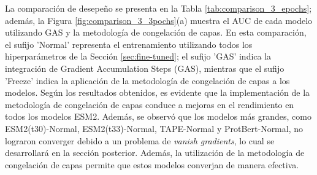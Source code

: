 La comparación de desepeño se presenta en la Tabla \ref{tab:comparison_3_epochs}; además, la Figura \ref{fig:comparison_3_3pochs}(a) muestra el AUC de cada modelo utilizando GAS y la metodología de congelación de capas. En esta comparación, el sufijo 'Normal' representa el entrenamiento  utilizando todos los hiperparámetros de la Sección \ref{sec:fine-tuned}; el sufijo 'GAS' indica la integración de Gradient Accumulation Steps (GAS), mientras que el sufijo 'Freeze' indica la aplicación de la metodología de congelación de capas a los modelos. Según los resultados obtenidos, es evidente que la implementación de la metodología de congelación de capas conduce a mejoras en el rendimiento en todos los modelos ESM2. Además, se observó que los modelos más grandes, como ESM2(t30)-Normal, ESM2(t33)-Normal, TAPE-Normal y ProtBert-Normal, no lograron converger debido a un problema de \textit{vanish gradients}, lo cual se desarrollará en la sección posterior. Además, la utilización de la metodología de congelación de capas permite que estos modelos converjan de manera efectiva.

